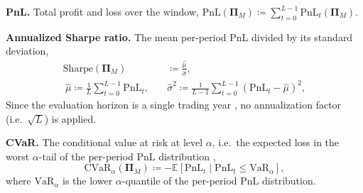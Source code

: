       \begin{enumerate}[label=\textbf{[U\arabic*]}]
        \item \textbf{PnL.} Total profit and loss over the window,
        \(\mathrm{PnL}(\mathbf{\Pi}_M) \coloneq \sum_{t=0}^{L-1}
        \mathrm{PnL}_t(\mathbf{\Pi}_M)\).

        \item \textbf{Annualized Sharpe ratio.} The mean per-period PnL
        divided by its standard deviation,
        \begin{equation}
          \begin{split}
            \mathrm{Sharpe}(\mathbf{\Pi}_M) &\coloneq
            \frac{\hat{\mu}}{\hat{\sigma}}, \\\
            \hat{\mu} \coloneq \frac{1}{L}\sum_{t=0}^{L-1}
            \mathrm{PnL}_t, \quad &
            \hat{\sigma}^2 \coloneq \frac{1}{L-1}
            \sum_{t=0}^{L-1} \left(\mathrm{PnL}_t -
            \hat{\mu}\right)^2,
          \end{split}
          \label{eq:utility-sharpe}
        \end{equation}
        Since the evaluation horizon is a single trading year
        , no annualization factor (i.e.\ \(\sqrt{L}\))
        is applied.


        \item \textbf{CVaR.} The conditional value at risk at level
        \(\alpha\), i.e.\ the expected loss in the worst \(\alpha\)-tail of
        the per-period PnL distribution \cite{Fecamp20},
        \begin{equation}
          \mathrm{CVaR}_\alpha(\mathbf{\Pi}_M) \coloneq
          -\mathbb{E}\left[\mathrm{PnL}_t \mid \mathrm{PnL}_t \leq
          \mathrm{VaR}_\alpha\right],
          \label{eq:utility-cvar}
        \end{equation}
        where \(\mathrm{VaR}_\alpha\) is the lower \(\alpha\)-quantile of
        the per-period PnL distribution.


\end{enumerate}
